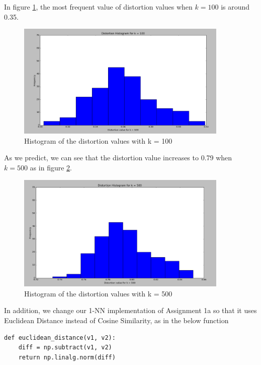 In figure \ref{k100}, the most frequent value of distortion values when $k = 100$ is around 0.35.

\begin{figure}[!htb]
\centering
\includegraphics[width=0.9\textwidth]{shots/k100.png}
\caption{Histogram of the distortion values with k = 100 }
\label{k100}
\end{figure}

As we predict, we can see that the distortion value increases to 0.79 when $k = 500$ as in figure \ref{k500}.

\begin{figure}[!htb]
\centering
\includegraphics[width=0.9\textwidth]{shots/k500.png}
\caption{Histogram of the distortion values with k = 500 }
\label{k500}
\end{figure} 

In addition, we change our 1-NN implementation of Assignment 1a so that it uses Euclidean Distance instead of Cosine Similarity, as in the below function 

\begin{lstlisting}[frame=single]
def euclidean_distance(v1, v2):
    diff = np.subtract(v1, v2)
    return np.linalg.norm(diff)
\end{lstlisting}

